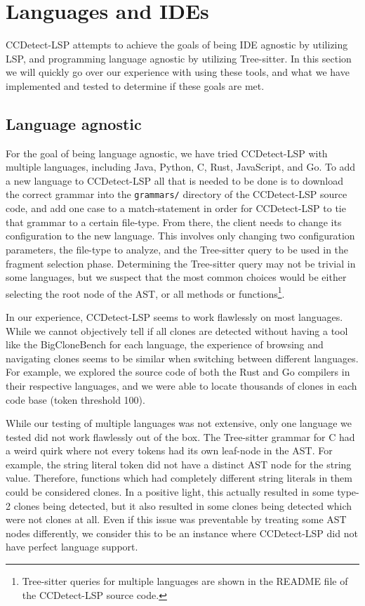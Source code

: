 \section{Languages and IDEs}

CCDetect-LSP attempts to achieve the goals of being IDE agnostic by utilizing LSP, and
programming language agnostic by utilizing Tree-sitter. In this section we will quickly go
over our experience with using these tools, and what we have implemented and tested to
determine if these goals are met.

\subsection*{Language agnostic}

For the goal of being language agnostic, we have tried CCDetect-LSP with multiple
languages, including Java, Python, C, Rust, JavaScript, and Go. To add a new language to
CCDetect-LSP all that is needed to be done is to download the correct grammar into the
\verb|grammars/| directory of the CCDetect-LSP source code, and add one case to a
match-statement in order for CCDetect-LSP to tie that grammar to a certain file-type. From
there, the client needs to change its configuration to the new language. This involves
only changing two configuration parameters, the file-type to analyze, and the Tree-sitter
query to be used in the fragment selection phase. Determining the Tree-sitter query may
not be trivial in some languages, but we suspect that the most common choices would be
either selecting the root node of the AST, or all methods or
functions\footnote{Tree-sitter queries for multiple languages are shown in the README file
of the CCDetect-LSP source code.}.

In our experience, CCDetect-LSP seems to work flawlessly on most languages. While we
cannot objectively tell if all clones are detected without having a tool like the
BigCloneBench for each language, the experience of browsing and navigating clones seems to
be similar when switching between different languages. For example, we explored the source
code of both the Rust and Go compilers in their respective languages, and we were able to
locate thousands of clones in each code base (token threshold 100).

While our testing of multiple languages was not extensive, only one language we tested did
not work flawlessly out of the box. The Tree-sitter grammar for C had a weird quirk where
not every tokens had its own leaf-node in the AST. For example, the string literal token
did not have a distinct AST node for the string value. Therefore, functions which had
completely different string literals in them could be considered clones. In a positive
light, this actually resulted in some type-2 clones being detected, but it also resulted
in some clones being detected which were not clones at all. Even if this issue was
preventable by treating some AST nodes differently, we consider this to be an instance
where CCDetect-LSP did not have perfect language support.

